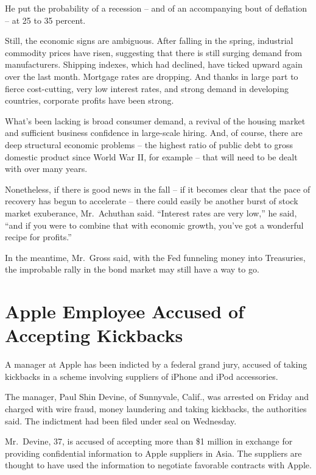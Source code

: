 ﻿\documentclass[12pt]{article}
\begin{document}
He put the probability of a recession -- and of an accompanying bout of deflation -- at 25 to 35
percent.

Still, the economic signs are ambiguous. After falling in the spring, industrial commodity prices
have risen, suggesting that there is still surging demand from manufacturers. Shipping indexes,
which had declined, have ticked upward again over the last month. Mortgage rates are dropping. And
thanks in large part to fierce cost-cutting, very low interest rates, and strong demand in
developing countries, corporate profits have been strong.

What's been lacking is broad consumer demand, a revival of the housing market and sufficient
business confidence in large-scale hiring. And, of course, there are deep structural economic
problems -- the highest ratio of public debt to gross domestic product since World War II, for
example -- that will need to be dealt with over many years.

Nonetheless, if there is good news in the fall -- if it becomes clear that the pace of recovery has
begun to accelerate -- there could easily be another burst of stock market exuberance, Mr.~Achuthan
said. ``Interest rates are very low,'' he said, ``and if you were to combine that with economic
growth, you've got a wonderful recipe for profits.''

In the meantime, Mr.~Gross said, with the Fed funneling money into Treasuries, the improbable rally
in the bond market may still have a way to go.

\section{Apple Employee Accused of Accepting Kickbacks}

\lettrine{A}{} manager at Apple has been indicted by a federal grand jury,
accused of taking kickbacks in a scheme involving suppliers of iPhone and iPod accessories.

The manager, Paul Shin Devine, of Sunnyvale, Calif., was arrested on Friday and charged with wire
fraud, money laundering and taking kickbacks, the authorities said. The indictment had been filed
under seal on Wednesday.

Mr.~Devine, 37, is accused of accepting more than \$1 million in exchange for providing confidential
information to Apple suppliers in Asia. The suppliers are thought to have used the information to
negotiate favorable contracts with Apple.
\end{document}
